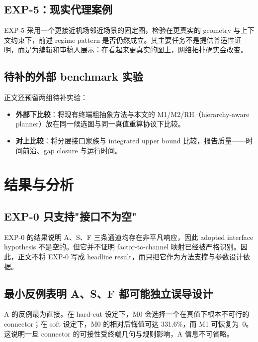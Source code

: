 \documentclass[review,authoryear]{elsarticle}
\begin{document}
\subsection{EXP-5：现实代理案例}
\label{sec:exp:proxy}

EXP-5 采用一个更接近机场邻近场景的固定图，检验在更真实的 geometry 与上下文约束下，前述 regime pattern 是否仍然成立。其主要任务不是提供普适性证明，而是为编辑和审稿人展示：在看起来更真实的图上，网络拓扑确实会改变。

\subsection{待补的外部 benchmark 实验}
\label{sec:exp:benchmark}

正文还预留两组待补实验：
\begin{itemize}
  \item \textbf{外部下比较}：将现有终端粗抽象方法与本文的 M1/M2/RH（hierarchy-aware planner）放在同一候选图与同一真值重算协议下比较。
  \item \textbf{对上比较}：将分层接口家族与 integrated upper bound 比较，报告质量——时间前沿、gap closure 与运行时间。
\end{itemize}


\section{结果与分析}
\label{sec:results}

\subsection{EXP-0 只支持"接口不为空"}
\label{sec:results:screening}

EXP-0 的结果说明 A、S、F 三条通道均存在非平凡响应，因此 adopted interface hypothesis 不是空的。但它并不证明 factor-to-channel 映射已经被严格识别。因此，正文不将 EXP-0 写成 headline result，而只把它作为方法支撑与参数设计依据。

\subsection{最小反例表明 A、S、F 都可能独立误导设计}
\label{sec:results:counterexamples}

A 的反例最为直接。在 hard-cut 设定下，M0 会选择一个在真值下根本不可行的 connector；在 soft 设定下，M0 的相对后悔值可达 331.6\%，而 M1 可恢复为~0。这说明一旦 connector 的可接性受终端几何与规则影响，A 信息不可省略。
\end{document}
